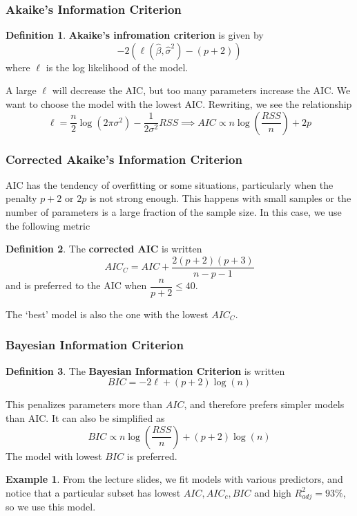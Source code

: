 \documentclass[12pt, a4paper]{article}
\theoremstyle{definition}
\newtheorem{definition}{Definition}
\newtheorem{example}{Example}
\newcommand{\imp}{\implies}
\newcommand{\f}{\frac}
\newcommand{\df}{\dfrac}
\newcommand{\BB}[1]{\left(#1\right)}
\begin{document}
	\subsubsection{Akaike's Information Criterion}
	
	\begin{definition}
		{\bf Akaike's infromation criterion} is given by
		$$
			-2 \BB{\ell(\hat\beta, \hat \sigma^2) - (p+2)} 
		$$
		where $\ell$ is the log likelihood of the model.
	\end{definition}
	
	 A large $\ell$ will decrease the AIC, but too many parameters increase the AIC. We want to choose the model with the lowest AIC. Rewriting, we see the relationship
	 $$\ell = \f{n}2 \log(2\pi \sigma^2) - \f1{2\sigma^2}RSS \imp AIC \propto n \log\BB{\f{RSS}{n}} + 2p$$
	 
	 \subsubsection{Corrected Akaike's Information Criterion}
	 
	 AIC has the tendency of overfitting or some situations, particularly when the penalty $p+2$ or $2p$ is not strong enough. This happens with small samples or the number of parameters is a large fraction of the sample size. In this case, we use the following metric
	 \begin{definition}
	 	The {\bf corrected AIC} is written 
	 	$$
	 		AIC_C = AIC + \f{2(p+2)(p+3)}{n-p-1}
	 	$$
	 	and is preferred to the AIC when $\df{n}{p+2} \leq 40$.
	 \end{definition}
 	The `best' model is also the one with the lowest $AIC_C$.
	
	\subsubsection{Bayesian Information Criterion}
	\begin{definition}
		The {\bf Bayesian Information Criterion} is written 
		$$
		BIC = - 2 \ell + (p+2)\log(n)
		$$
	\end{definition}
	This penalizes parameters more than $AIC$, and therefore prefers simpler models than AIC. It can also be simplified as
	$$
		BIC \propto  n \log\BB{\f{RSS}{n}} + (p+2)\log(n)
	$$
	The model with lowest $BIC$ is preferred.
	
	\begin{example}
		From the lecture slides, we fit models with various predictors, and notice that a particular subset has lowest $AIC, AIC_c, BIC$ and high $R^2_{adj} = 93\%$, so we use this model.
	\end{example}
\end{document}
